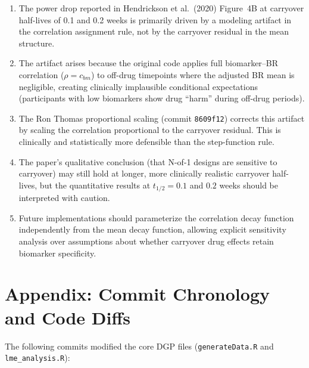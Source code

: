 \documentclass[11pt]{article}
\begin{document}
\begin{enumerate}
\item The power drop reported in Hendrickson et al.\ (2020)
  Figure~4B at carryover half-lives of 0.1 and 0.2 weeks is
  primarily driven by a modeling artifact in the correlation
  assignment rule, not by the carryover residual in the mean
  structure.

\item The artifact arises because the original code applies
  full biomarker--BR correlation ($\rho = c_{bm}$) to
  off-drug timepoints where the adjusted BR mean is
  negligible, creating clinically implausible conditional
  expectations (participants with low biomarkers show drug
  ``harm'' during off-drug periods).

\item The Ron Thomas proportional scaling (commit
  \texttt{8609f12}) corrects this artifact by scaling the
  correlation proportional to the carryover residual. This
  is clinically and statistically more defensible than the
  step-function rule.

\item The paper's qualitative conclusion (that N-of-1
  designs are sensitive to carryover) may still hold at
  longer, more clinically realistic carryover half-lives,
  but the quantitative results at $t_{1/2} = 0.1$ and
  $0.2$ weeks should be interpreted with caution.

\item Future implementations should parameterize the
  correlation decay function independently from the mean
  decay function, allowing explicit sensitivity analysis
  over assumptions about whether carryover drug effects
  retain biomarker specificity.
\end{enumerate}

\section*{Appendix: Commit Chronology and Code Diffs}

The following commits modified the core DGP files
(\texttt{generateData.R} and \texttt{lme\_analysis.R}):
\end{document}

